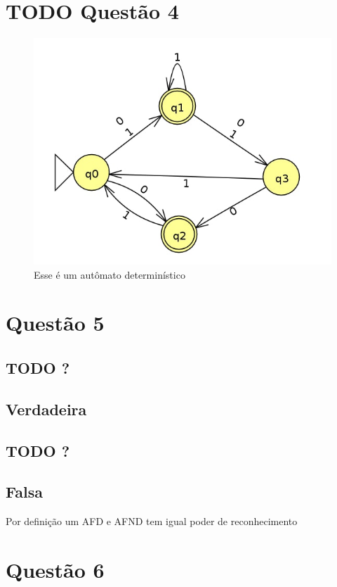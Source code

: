 \documentclass[11pt]{article}
\begin{document}
\section{{\bfseries\sffamily TODO} Questão 4}
\label{sec:orgccafb55}
\begin{figure}[htbp]
\centering
\includegraphics[width=.9\linewidth]{./q4/q4.jpg}
\caption{\label{fig:org8ff15e8}
Esse é um autômato determinístico}
\end{figure}
\section{Questão 5}
\label{sec:org60a200f}

\subsection{{\bfseries\sffamily TODO} ?}
\label{sec:org7a775f3}
\subsection{Verdadeira}
\label{sec:org55562df}
\subsection{{\bfseries\sffamily TODO} ?}
\label{sec:org16d58fe}
\subsection{Falsa}
\label{sec:org22feb0b}
Por definição um AFD e AFND tem igual poder de reconhecimento

\section{Questão 6}
\label{sec:org8944c47}
\end{document}
